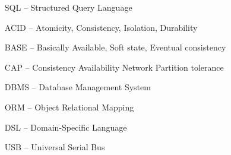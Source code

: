 \begin{itemize}[leftmargin=2cm, topsep=0pt, partopsep=5pt,itemsep=0pt,parsep=0pt]
\item[SQL --] Structured Query Language
\item[ACID --] Atomicity, Consistency, Isolation, Durability
\item[BASE --] Basically Available, Soft state, Eventual consistency
\item[CAP --] Consistency Availability Network Partition tolerance
\item[DBMS --] Database Management System
\item[ORM --] Object Relational Mapping
\item[DSL --] Domain-Specific Language
\item[USB --] Universal Serial Bus
\end{itemize}